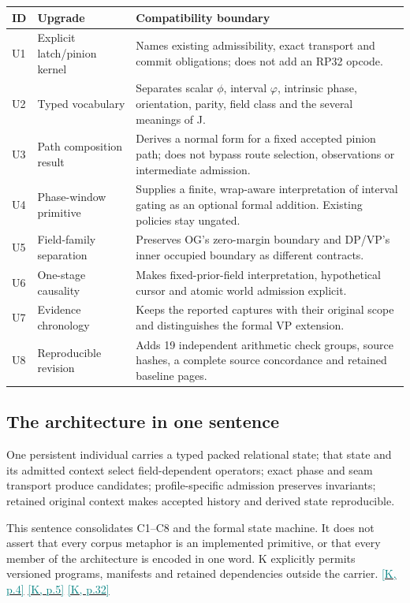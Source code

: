 \documentclass[11pt,a4paper]{article}
\newcommand{\kref}[1]{\hyperlink{baseline.#1}{\textcolor{teal}{[K, p.#1]}}}
\theoremstyle{lpstyle}
\begin{document}
\begin{tabularx}{\textwidth}{L{9mm}L{42mm}Y}
\toprule
\textbf{ID}&\textbf{Upgrade}&\textbf{Compatibility boundary}\\\midrule
U1&Explicit latch/pinion kernel&Names existing admissibility, exact transport and commit obligations; does not add an RP32 opcode.\\
U2&Typed vocabulary&Separates scalar $\phi$, interval $\varphi$, intrinsic phase, orientation, parity, field class and the several meanings of J.\\
U3&Path composition result&Derives a normal form for a fixed accepted pinion path; does not bypass route selection, observations or intermediate admission.\\
U4&Phase-window primitive&Supplies a finite, wrap-aware interpretation of interval gating as an optional formal addition. Existing policies stay ungated.\\
U5&Field-family separation&Preserves OG's zero-margin boundary and DP/VP's inner occupied boundary as different contracts.\\
U6&One-stage causality&Makes fixed-prior-field interpretation, hypothetical cursor and atomic world admission explicit.\\
U7&Evidence chronology&Keeps the reported captures with their original scope and distinguishes the formal VP extension.\\
U8&Reproducible revision&Adds 19 independent arithmetic check groups, source hashes, a complete source concordance and retained baseline pages.\\\bottomrule
\end{tabularx}

\subsection{The architecture in one sentence}
\begin{principle}
One persistent individual carries a typed packed relational state; that state and its admitted context select field-dependent operators; exact phase and seam transport produce candidates; profile-specific admission preserves invariants; retained original context makes accepted history and derived state reproducible.
\end{principle}
This sentence consolidates C1--C8 and the formal state machine. It does not assert that every corpus metaphor is an implemented primitive, or that every member of the architecture is encoded in one word. K explicitly permits versioned programs, manifests and retained dependencies outside the carrier. \kref{4} \kref{5} \kref{32}
\end{document}

